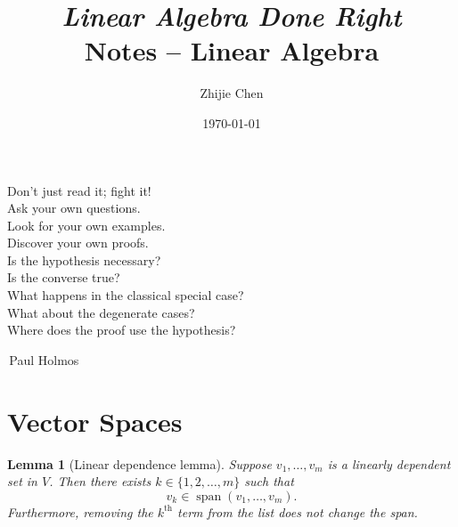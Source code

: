 \documentclass[nofonts,colorlinks]{tufte-handout}
\title{	
	\normalfont\normalsize 
	{\itshape Linear Algebra Done Right} \\ [0pt]
	\huge Notes -- Linear Algebra
}
\author{Zhijie Chen}
\date{\vspace{-5pt}\normalsize\today}
\theoremstyle{plain} %
\newtheorem{lem}[thm]{Lemma}
\theoremstyle{definition}
\newtheorem{notns}[thm]{Notations}
\theoremstyle{remark}
\newcommand{\F}{\mathbb{F}}
\DeclareMathOperator{\spn}{span}
\begin{document}
\justifying
\maketitle
\tableofcontents
\newpage

\thispagestyle{empty}
\begin{fullwidth}
	\Large
	\vspace*{\fill}
	\begin{center}
		Don't just read it; fight it!\\
		Ask your own questions.\\
		Look for your own examples.\\
		Discover your own proofs.\\
		Is the hypothesis necessary?\\
		Is the converse true?\\
		What happens in the classical special case?\\
		What about the degenerate cases?\\
		Where does the proof use the hypothesis?
	\end{center}
	\begin{flushright}
		\textemdash\,Paul Holmos\phantom{mmmmmmmmmmmmmmm}
	\end{flushright}
	\vspace*{\fill}
\end{fullwidth}
\newpage





\section{Vector Spaces}
\begin{lem}[Linear dependence lemma]
	Suppose $v_1,\dots,v_m$ is a linearly dependent set in $V$. Then there exists $k\in\{1,2,\dots,m\}$ such that
	\[v_k\in\spn(v_1,\dots,v_m).\]
	Furthermore, removing the $k^\text{th}$ term from the list does not change the span.
\end{lem}
\end{document}
